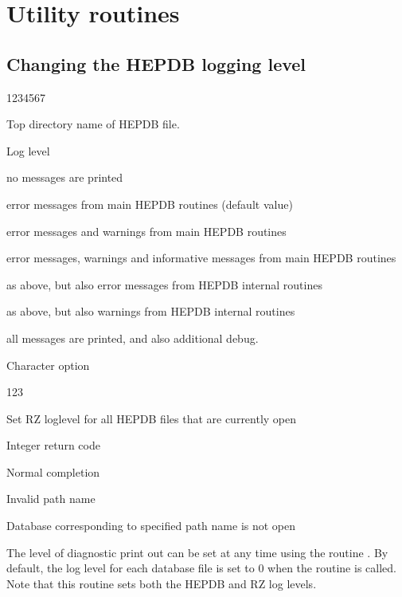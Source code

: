 \section{Utility routines}

\subsection{Changing the HEPDB logging level}


\begin{DLtt}{1234567}
\item[PATH]Top directory name of HEPDB file.
\item[LOGLEV]Log level
 \begin{DLtt}{12}
   \item[<0]no messages are printed
   \item[\ 1]error messages from main HEPDB routines (default value)
   \item[\ 2]error messages and warnings from main HEPDB routines
   \item[\ 3]error messages, warnings and informative messages from
     main HEPDB routines
   \item[\ 4]as above, but also error messages from HEPDB internal routines
   \item[\ 5]as above, but also warnings from HEPDB internal routines
   \item[>5]all messages are printed, and also additional debug.
 \end{DLtt}
\item[CHOPT]Character option
  \begin{DLtt}{123}
    \item['A']Set RZ loglevel for all HEPDB files that are currently open
  \end{DLtt}
\item[IRC]Integer return code
  \begin{DLtt}{1}
    \item[0]Normal completion
    \item[1]Invalid path name
    \item[2]Database corresponding to specified path name is not open
  \end{DLtt}
\end{DLtt}

The level of diagnostic print out can be set at any time using the
routine . By default, the log level for each database
file is  set to 0 when the routine  is called.
Note that this routine sets both the HEPDB and RZ log levels.

